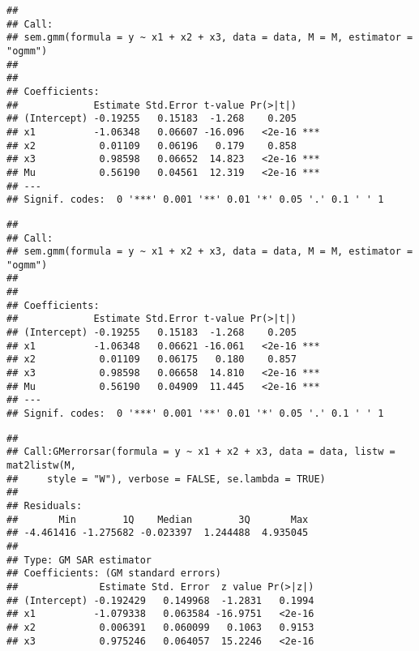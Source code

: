 \begin{knitrout}
\begin{kframe}
\begin{verbatim}
## 
## Call:
## sem.gmm(formula = y ~ x1 + x2 + x3, data = data, M = M, estimator = "ogmm")
## 
## 
## Coefficients:
##             Estimate Std.Error t-value Pr(>|t|)    
## (Intercept) -0.19255   0.15183  -1.268    0.205    
## x1          -1.06348   0.06607 -16.096   <2e-16 ***
## x2           0.01109   0.06196   0.179    0.858    
## x3           0.98598   0.06652  14.823   <2e-16 ***
## Mu           0.56190   0.04561  12.319   <2e-16 ***
## ---
## Signif. codes:  0 '***' 0.001 '**' 0.01 '*' 0.05 '.' 0.1 ' ' 1
\end{verbatim}
\begin{alltt}
  \hlstd{=} \hlstd{)}
\end{alltt}
\begin{verbatim}
## 
## Call:
## sem.gmm(formula = y ~ x1 + x2 + x3, data = data, M = M, estimator = "ogmm")
## 
## 
## Coefficients:
##             Estimate Std.Error t-value Pr(>|t|)    
## (Intercept) -0.19255   0.15183  -1.268    0.205    
## x1          -1.06348   0.06621 -16.061   <2e-16 ***
## x2           0.01109   0.06175   0.180    0.857    
## x3           0.98598   0.06658  14.810   <2e-16 ***
## Mu           0.56190   0.04909  11.445   <2e-16 ***
## ---
## Signif. codes:  0 '***' 0.001 '**' 0.01 '*' 0.05 '.' 0.1 ' ' 1
\end{verbatim}
\begin{alltt}
    \hlkwb{<-}  \hlopt{~}  \hlopt{+}  \hlopt{+} 
                         
                         \hlstd{=}   \hlstd{=} \hlstd{),}
                         \hlstd{=} \hlstd{,}
                         \hlstd{=} \hlstd{)}
\end{alltt}
\begin{verbatim}
## 
## Call:GMerrorsar(formula = y ~ x1 + x2 + x3, data = data, listw = mat2listw(M, 
##     style = "W"), verbose = FALSE, se.lambda = TRUE)
## 
## Residuals:
##       Min        1Q    Median        3Q       Max 
## -4.461416 -1.275682 -0.023397  1.244488  4.935045 
## 
## Type: GM SAR estimator
## Coefficients: (GM standard errors) 
##              Estimate Std. Error  z value Pr(>|z|)
## (Intercept) -0.192429   0.149968  -1.2831   0.1994
## x1          -1.079338   0.063584 -16.9751   <2e-16
## x2           0.006391   0.060099   0.1063   0.9153
## x3           0.975246   0.064057  15.2246   <2e-16

\end{verbatim}
\end{kframe}
\end{knitrout}
